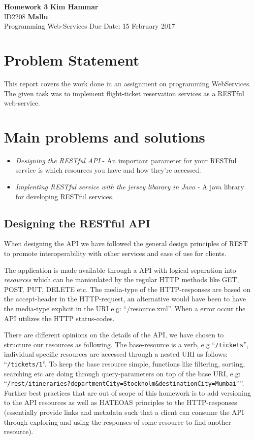\documentclass[a4paper, 11pt]{article}
\begin{document}
\noindent
\large\textbf{Homework 3} \hfill \textbf{Kim Hammar} \\
\normalsize ID2208 \hfill  \textbf{Mallu} \\
Programming Web-Services \hfill Due Date: 15 February 2017\\

\section*{Problem Statement}
This report covers the work done in an assignment on programming WebServices. The given task was to implement flight-ticket reservation services as a RESTful web-service.

\section*{Main problems and solutions}
\begin{itemize}
\item \textit{Designing the RESTful API} - An important parameter for your RESTful service is which resources you have and how they're accessed.
  
\item \textit{Implenting RESTful service with the jersey libarary in Java \citep{jersey}} - A java library for developing RESTful services.
\end{itemize}

\subsection*{Designing the RESTful API}
When designing the API we have followed the general design principles of REST to promote interoperability with other services and ease of use for clients.

The application is made available through a API with logical separation into \textit{resources} which can be manioulated by the regular HTTP methods like GET, POST, PUT, DELETE etc. The media-type of the HTTP-responses are based on the accept-header in the HTTP-request, an alternative would have been to have the media-type explicit in the URI e.g: ``/resource.xml''. When a error occur the API utilizes the HTTP status-codes.

There are different opinions on the details of the API, we have chosen to structure our resources as following. The base-resource is a verb, e.g ``\texttt{/tickets}'', individual specific resources are accessed through a nested URI as follows: ``\texttt{/tickets/1}''. To keep the base resource simple, functions like filtering, sorting, searching etc are doing through query-parameters on top of the base URI, e.g: ``\texttt{/rest/itineraries?departmentCity=Stockholm\&destinationCity=Mumbai`}''. Further best practices that are out of scope of this homework is to add versioning to the API resources as well as HATEOAS principles to the HTTP-responses (essentially provide links and metadata such that a client can consume the API through exploring and using the responses of some resource to find another resource).
\end{document}
